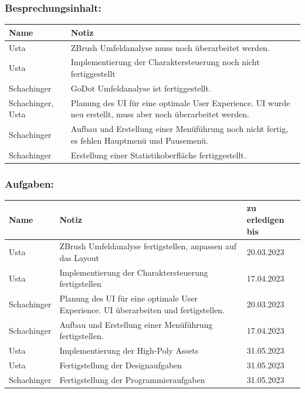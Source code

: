 \subsubsection*{Besprechungsinhalt:}
\begin{tabular}{|m{}|m{}|}
\hline
Name & Notiz \\
\hline
Usta & ZBrush Umfeldanalyse muss noch überarbeitet werden. \\
\hline
Usta & Implementierung der Charaktersteuerung noch nicht fertiggestellt \\
\hline
Schachinger & GoDot Umfeldanalyse ist fertiggestellt. \\
\hline
Schachinger, Usta & Planung des UI für eine optimale User Experience. UI wurde neu erstellt, muss aber noch überarbeitet werden. \\
\hline
Schachinger & Aufbau und Erstellung einer Menüführung noch nicht fertig, es fehlen Hauptmenü und Pausemenü.\\
\hline
Schachinger & Erstellung einer Statistikoberfläche fertiggestellt. \\
\hline
\end{tabular}

\subsubsection*{Aufgaben:}
\begin{tabular}{|m{}|m{}|m{}|}
\hline
Name & Notiz & zu erledigen bis \\
\hline
Usta & ZBrush Umfeldanalyse fertigstellen, anpassen auf das Layout & 20.03.2023 \\
\hline
Usta & Implementierung der Charaktersteuerung fertigstellen & 17.04.2023 \\
\hline
Schachinger & Planung des UI für eine optimale User Experience. UI überarbeiten und fertigstellen. & 20.03.2023 \\
\hline
Schachinger & Aufbau und Erstellung einer Menüführung fertigstellen. & 17.04.2023 \\
\hline
Usta & Implementierung der High-Poly Assets & 31.05.2023 \\
\hline
Usta & Fertigstellung der Designaufgaben & 31.05.2023 \\
\hline
Schachinger & Fertigstellung der Programmieraufgaben & 31.05.2023 \\
\hline
\end{tabular}


